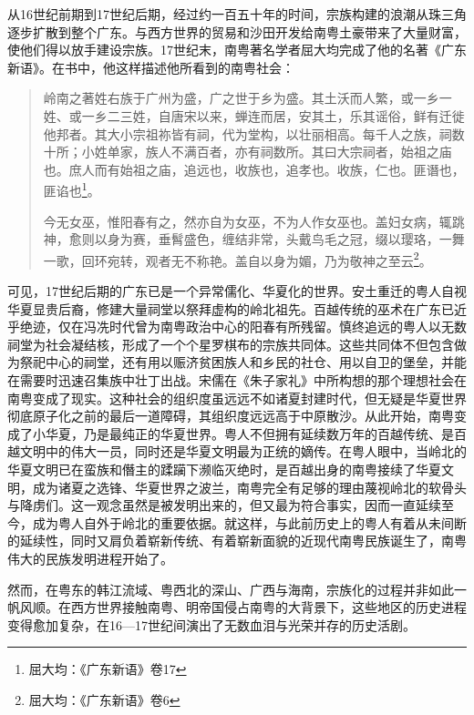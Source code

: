 从16世纪前期到17世纪后期，经过约一百五十年的时间，宗族构建的浪潮从珠三角逐步扩散到整个广东。与西方世界的贸易和沙田开发给南粤土豪带来了大量财富，使他们得以放手建设宗族。17世纪末，南粤著名学者屈大均完成了他的名著《广东新语》。在书中，他这样描述他所看到的南粤社会：

\begin{quote}

岭南之著姓右族于广州为盛，广之世于乡为盛。其土沃而人繁，或一乡一姓、或一乡二三姓，自唐宋以来，蝉连而居，安其土，乐其谣俗，鲜有迁徙他邦者。其大小宗祖祢皆有祠，代为堂构，以壮丽相高。每千人之族，祠数十所；小姓单家，族人不满百者，亦有祠数所。其曰大宗祠者，始祖之庙也。庶人而有始祖之庙，追远也，收族也，追孝也。收族，仁也。匪谮也，匪谄也\footnote{屈大均：《广东新语》卷17}。

今无女巫，惟阳春有之，然亦自为女巫，不为人作女巫也。盖妇女病，辄跳神，愈则以身为赛，垂髾盛色，缠结非常，头戴鸟毛之冠，缀以璎珞，一舞一歌，回环宛转，观者无不称艳。盖自以身为媚，乃为敬神之至云\footnote{屈大均：《广东新语》卷6}。

\end{quote}

可见，17世纪后期的广东已是一个异常儒化、华夏化的世界。安土重迁的粤人自视华夏显贵后裔，修建大量祠堂以祭拜虚构的岭北祖先。百越传统的巫术在广东已近乎绝迹，仅在冯冼时代曾为南粤政治中心的阳春有所残留。慎终追远的粤人以无数祠堂为社会凝结核，形成了一个个星罗棋布的宗族共同体。这些共同体不但包含做为祭祀中心的祠堂，还有用以赈济贫困族人和乡民的社仓、用以自卫的堡垒，并能在需要时迅速召集族中壮丁出战。宋儒在《朱子家礼》中所构想的那个理想社会在南粤变成了现实。这种社会的组织度虽远远不如诸夏封建时代，但无疑是华夏世界彻底原子化之前的最后一道障碍，其组织度远远高于中原散沙。从此开始，南粤变成了小华夏，乃是最纯正的华夏世界。粤人不但拥有延续数万年的百越传统、是百越文明中的伟大一员，同时还是华夏文明最为正统的嫡传。在粤人眼中，当岭北的华夏文明已在蛮族和僭主的蹂躏下濒临灭绝时，是百越出身的南粤接续了华夏文明，成为诸夏之选锋、华夏世界之波兰，南粤完全有足够的理由蔑视岭北的软骨头与降虏们。这一观念虽然是被发明出来的，但又最为符合事实，因而一直延续至今，成为粤人自外于岭北的重要依据。就这样，与此前历史上的粤人有着从未间断的延续性，同时又肩负着崭新传统、有着崭新面貌的近现代南粤民族诞生了，南粤伟大的民族发明进程开始了。

然而，在粤东的韩江流域、粤西北的深山、广西与海南，宗族化的过程并非如此一帆风顺。在西方世界接触南粤、明帝国侵占南粤的大背景下，这些地区的历史进程变得愈加复杂，在16—17世纪间演出了无数血泪与光荣并存的历史活剧。







